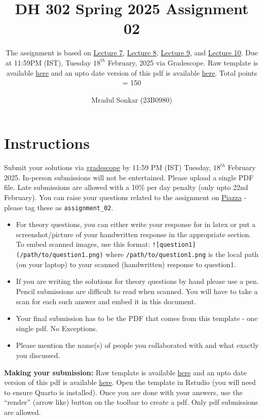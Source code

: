 \documentclass[
  letterpaper,
  DIV=11,
  numbers=noendperiod]{scrartcl}
\title{DH 302 Spring 2025 Assignment 02}
\subtitle{The assignment is based on
\href{https://docs.google.com/presentation/d/15kxh03hVBR1ybnuBBvbT5pfInju1IVkmVH1trWbKJn4/edit?usp=sharing}{Lecture
7},
\href{https://docs.google.com/presentation/d/1ilRr6T5N26kLWjIoP-ttUbXLsKxCW8SFx92DAf-R8zA/edit?usp=sharing}{Lecture
8},
\href{https://docs.google.com/presentation/d/1vc9WxkdTmCMudnAxxe6cFRUyRALaN0CQ8ixm3Np4IXU/edit?usp=sharing}{Lecture
9}, and
\href{https://docs.google.com/presentation/d/1VT9ynRKMkdEBG9ysfBDhZR1c0DZ_UZ9Vvvzci22lbuw/edit?usp=sharing}{Lecture
10}. Due at 11:59PM (IST), Tuesday \(18^{th}\) February, 2025 via
Gradescope. Raw template is available
\href{https://drive.google.com/file/d/1RvXnFnPkDVPGGwllD187HW0MkutruZJv/view?usp=sharing}{here}
and an upto date version of this pdf is available
\href{https://drive.google.com/file/d/1RvXnFnPkDVPGGwllD187HW0MkutruZJv/view?usp=sharing}{here}.
Total points = 150}
\author{Mradul Sonkar (23B0980)}
\date{}
\providecommand{\tightlist}{%
  \setlength{\itemsep}{0pt}\setlength{\parskip}{0pt}}\usepackage{longtable,booktabs,array}
\begin{document}
\maketitle


\section{Instructions}\label{instructions}

Submit your solutions via
\href{https://www.gradescope.com/courses/946202}{gradescope} by 11:59 PM
(IST) Tuesday, \(18^{th}\) February 2025. In-person submissions will not
be entertained. Please upload a single PDF file. Late submissions are
allowed with a 10\% per day penalty (only upto 22nd February). You can
raise your questions related to the assignment on
\href{https://piazza.com/class/m5k3nf7l4e91cg/post/m6alu8nsltc1pq}{Piazza}
- please tag these as \texttt{assignment\_02}.

\begin{itemize}
\tightlist
\item
  For theory questions, you can either write your response for in latex
  or put a screenshot/picture of your handwritten response in the
  appropriate section. To embed scanned images, use this format:
  \texttt{!{[}question1{]}(/path/to/question1.png)} where
  \texttt{/path/to/question1.png} is the local path (on your laptop) to
  your scanned (handwritten) response to question1.
\item
  If you are writing the solutions for theory questions by hand please
  use a pen. Pencil submissions are difficult to read when scanned. You
  will have to take a scan for each such answer and embed it in this
  document.
\item
  Your final submission has to be the PDF that comes from this template
  - one single pdf. No Exceptions.
\item
  Please mention the name(s) of people you collaborated with and what
  exactly you discussed.
\end{itemize}

\textbf{Making your submission:} Raw template is available
\href{https://drive.google.com/file/d/1RvXnFnPkDVPGGwllD187HW0MkutruZJv/view?usp=sharing}{here}
and an upto date version of this pdf is available
\href{https://drive.google.com/file/d/1RvXnFnPkDVPGGwllD187HW0MkutruZJv/view?usp=sharing}{here}.
Open the template in Rstudio (you will need to ensure Quarto is
installed). Once you are done with your answers, use the ``render''
(arrow like) button on the toolbar to create a pdf. Only pdf submissions
are allowed.
\end{document}
